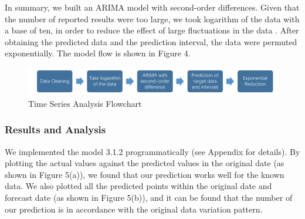 \documentclass[12pt]{article}
\begin{document}
In summary, we built an ARIMA model with second-order differences. 
Given that the number of reported results were too large, we took logarithm of the data with a base of ten, in order to reduce the effect of large fluctuations in the data . After obtaining the predicted data and the prediction interval, the data were permuted exponentially. 
The model flow is shown in Figure 4.

\begin{figure}[H]
    \centering
    \includegraphics[scale=0.5]{1_1 flow2.png}
    \caption{Time Series Analysis Flowchart}
\end{figure}




\subsubsection{Results and Analysis}
We implemented the model 3.1.2 programmatically (see Appendix for details). By plotting the actual values against the predicted values in the original date (as shown in Figure 5(a)), we found that our prediction works well for the known data. We also plotted all the predicted points within the original date and forecast date (as shown in Figure 5(b)), and it can be found that the number of our prediction is in accordance with the original data variation pattern.
\end{document}
